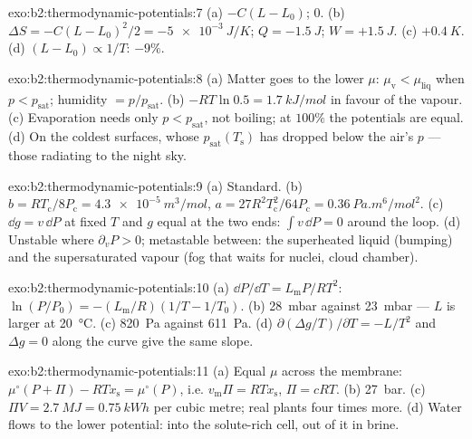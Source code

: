 \begin{solution}{exo:b2:thermodynamic-potentials:7}
(a) $-C(L - L_0)$; $0$. (b) $\Delta S = -C(L - L_0)^2/2 = \qty{-5e-3}{J/K}$; $Q =
\qty{-1.5}{J}$; $W = +\qty{1.5}{J}$. (c) $+\qty{0.4}{K}$. (d) $(L - L_0) \propto
1/T$: $-9\%$.
\end{solution}

\begin{solution}{exo:b2:thermodynamic-potentials:8}
(a) Matter goes to the lower $\mu$: $\mu_{\text{v}} < \mu_{\text{liq}}$ when $p <
p_{\text{sat}}$; humidity $= p/p_{\text{sat}}$. (b) $-RT\ln 0.5 = \qty{1.7}{kJ/mol}$
in favour of the vapour. (c) Evaporation needs only $p < p_{\text{sat}}$,
not boiling; at $100\%$ the potentials are equal. (d) On the coldest
surfaces, whose $p_{\text{sat}}(T_{\text{s}})$ has dropped below the air's $p$
--- those radiating to the night sky.
\end{solution}

\begin{solution}{exo:b2:thermodynamic-potentials:9}
(a) Standard. (b) $b = RT_{\text{c}}/8P_{\text{c}} = \qty{4.3e-5}{m^3/mol}$, $a =
27R^2T_{\text{c}}^2/64P_{\text{c}} = \qty{0.36}{Pa.m^6/mol^2}$. (c) $\dd g = v\,\dd P$
at fixed $T$ and $g$ equal at the two ends: $\int v\,\dd P = 0$ around the
loop. (d) Unstable where $\partial_vP > 0$; metastable between: the
superheated liquid (bumping) and the supersaturated vapour (fog that
waits for nuclei, cloud chamber).
\end{solution}

\begin{solution}{exo:b2:thermodynamic-potentials:10}
(a) $\dd P/\dd T = L_{\text{m}}P/RT^2$: $\ln(P/P_0) = -(L_{\text{m}}/R)(1/T - 1/T_0)$.
(b) \qty{28}{mbar} against \qty{23}{mbar} --- $L$ is larger at \qty{20}{\celsius}.
(c) \qty{820}{Pa} against \qty{611}{Pa}. (d) $\partial(\Delta g/T)/\partial T = -L/T^2$
and $\Delta g = 0$ along the curve give the same slope.
\end{solution}

\begin{solution}{exo:b2:thermodynamic-potentials:11}
(a) Equal $\mu$ across the membrane: $\mu^\circ(P + \Pi) - RTx_{\text{s}} =
\mu^\circ(P)$, i.e. $v_{\text{m}}\Pi = RTx_{\text{s}}$, $\Pi = cRT$. (b) \qty{27}{bar}.
(c) $\Pi V = \qty{2.7}{MJ} = \qty{0.75}{kWh}$ per cubic metre; real plants
four times more. (d) Water flows to the lower potential: into the
solute-rich cell, out of it in brine.
\end{solution}

